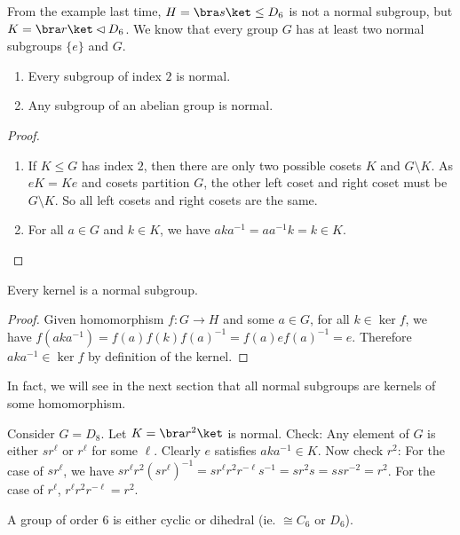 \documentclass[a4paper]{article}
\begin{document}
From the example last time, $H=\bra s\ket\leq D_6$ is not a normal subgroup, but $K=\bra r\ket \lhd D_6$. We know that every group $G$ has at least two normal subgroups $\{e\}$ and $G$.

\begin{lemma}\leavevmode
  \begin{enumerate}
    \item Every subgroup of index $2$ is normal.
    \item Any subgroup of an abelian group is normal.
  \end{enumerate}
\end{lemma}

\begin{proof}\leavevmode
  \begin{enumerate}
    \item If $K\leq G$ has index $2$, then there are only two possible cosets $K$ and $G\setminus K$. As $eK = Ke$ and cosets partition $G$, the other left coset and right coset must be $G\setminus K$. So all left cosets and right cosets are the same.
    \item For all $a\in G$ and $k\in K$, we have $aka^{-1} = aa^{-1}k = k\in K$.
  \end{enumerate}
\end{proof}
\begin{prop}
  Every kernel is a normal subgroup.
\end{prop}

\begin{proof}
  Given homomorphism $f:G\rightarrow H$ and some $a\in G$, for all $k\in \ker f$, we have $f(aka^{-1}) = f(a)f(k)f(a)^{-1} = f(a)ef(a)^{-1} = e$. Therefore $aka^{-1}\in\ker f$ by definition of the kernel.
\end{proof}

In fact, we will see in the next section that all normal subgroups are kernels of some homomorphism.

\begin{eg}
  Consider $G = D_8$. Let $K = \bra r^2\ket$ is normal. Check: Any element of $G$ is either $sr^\ell$ or $r^\ell$ for some $\ell$. Clearly $e$ satisfies $aka^{-1}\in K$. Now check $r^2$: For the case of $sr^\ell$, we have $sr^\ell r^2(sr^\ell)^{-1} = sr^\ell r^2 r^{-\ell}s^{-1} = sr^2 s = ssr^{-2} = r^2$. For the case of $r^\ell$, $r^\ell r^2r^{-\ell} = r^2$.
\end{eg}

\begin{prop}
  A group of order $6$ is either cyclic or dihedral (ie. $\cong C_6$ or $D_6$).
\end{prop}
\end{document}
